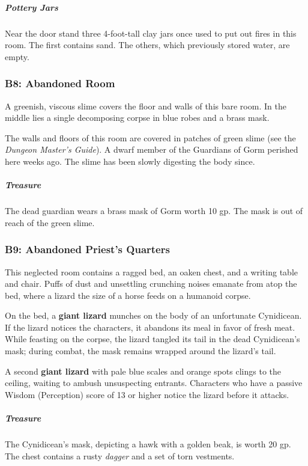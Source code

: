 \documentclass[10pt,a4paper,twoside,bg=print,twocolumn,openany,nodeprecatedcode]{dndbook}
\begin{document}
\subparagraph{Pottery Jars}
Near the door stand three 4-foot-tall clay jars once used to put out fires in this room. The first contains sand. The others, which previously stored water, are empty.

\subsubsection{B8: Abandoned Room}
\begin{DndReadAloud}{}
A greenish, viscous slime covers the floor and walls of this bare room. In the middle lies a single decomposing corpse in blue robes and a brass mask.

\end{DndReadAloud}

The walls and floors of this room are covered in patches of green slime (see the \textit{Dungeon Master's Guide}). A dwarf member of the Guardians of Gorm perished here weeks ago. The slime has been slowly digesting the body since.

\subparagraph{Treasure}
The dead guardian wears a brass mask of Gorm worth 10 gp. The mask is out of reach of the green slime.

\subsubsection{B9: Abandoned Priest's Quarters}
\begin{DndReadAloud}{}
This neglected room contains a ragged bed, an oaken chest, and a writing table and chair. Puffs of dust and unsettling crunching noises emanate from atop the bed, where a lizard the size of a horse feeds on a humanoid corpse.

\end{DndReadAloud}

On the bed, a \textbf{giant lizard} munches on the body of an unfortunate Cynidicean. If the lizard notices the characters, it abandons its meal in favor of fresh meat. While feasting on the corpse, the lizard tangled its tail in the dead Cynidicean's mask; during combat, the mask remains wrapped around the lizard's tail.

A second \textbf{giant lizard} with pale blue scales and orange spots clings to the ceiling, waiting to ambush unsuspecting entrants. Characters who have a passive Wisdom (Perception) score of 13 or higher notice the lizard before it attacks.

\subparagraph{Treasure}
The Cynidicean's mask, depicting a hawk with a golden beak, is worth 20 gp. The chest contains a rusty \textit{dagger} and a set of torn vestments.
\end{document}
